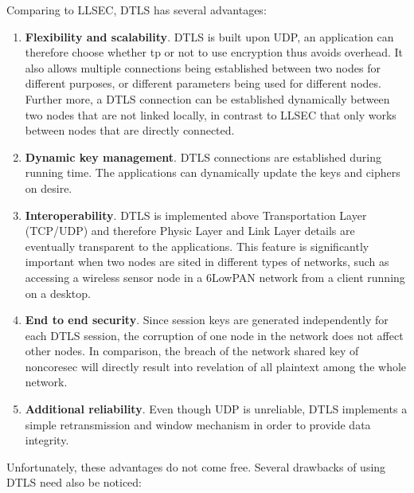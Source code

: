 Comparing to LLSEC, DTLS has several advantages:
\begin{enumerate}
\item \textbf{Flexibility and scalability}. DTLS is built upon UDP, an application can therefore choose whether tp or not to use encryption thus avoids overhead. It also allows multiple connections being established between two nodes for different purposes, or different parameters being used for different nodes. Further more, a DTLS connection can be established dynamically between two nodes that are not linked locally, in contrast to LLSEC that only works between nodes that are directly connected.
\item \textbf{Dynamic key management}. DTLS connections are established during running time. The applications can dynamically update the keys and ciphers on desire.
\item \textbf{Interoperability}. DTLS is implemented above Transportation Layer (TCP/UDP) and therefore Physic Layer and Link Layer details are eventually transparent to the applications. This feature is significantly important when two nodes are sited in different types of networks, such as accessing a wireless sensor node in a 6LowPAN network from a client running on a desktop. 
\item \textbf{End to end security}. Since session keys are generated independently for each DTLS session, the corruption of one node in the network does not affect other nodes. In comparison, the breach of the network shared key of noncoresec will directly result into revelation of all plaintext among the whole network.
\item \textbf{Additional reliability}. Even though UDP is unreliable, DTLS implements a simple retransmission and window mechanism in order to provide data integrity.
\end{enumerate}

Unfortunately, these advantages do not come free. Several drawbacks of using DTLS need also be noticed:

